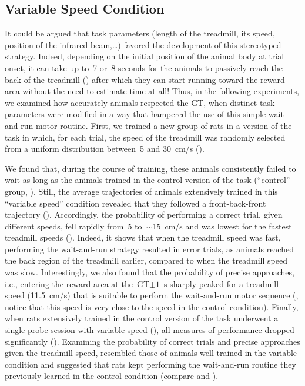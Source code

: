 \subsection{Variable Speed Condition}
\label{ch:time:varSpeed}

It could be argued that task parameters (length of the treadmill, its speed, position of the infrared beam,\dots) favored the development of this stereotyped strategy.
Indeed, depending on the initial position of the animal body at trial onset, it can take up to~7 or~8 seconds for the animals to passively reach the back of the treadmill () after which they can start running toward the reward area without the need to estimate time at all!
Thus, in the following experiments, we examined how accurately animals respected the GT, when distinct task parameters were modified in a way that hampered the use of this simple wait-and-run motor routine.
First, we trained a new group of rats in a version of the task in which, for each trial, the speed of the treadmill was randomly selected from a uniform distribution between~5 and 30~cm/s ().

We found that, during the course of training, these animals consistently failed to wait as long as the animals trained in the control version of the task (``control'' group, ).
Still, the average trajectories of animals extensively trained in this ``variable speed'' condition revealed that they followed a front-back-front trajectory ().
Accordingly, the probability of performing a correct trial, given different speeds, fell rapidly from~5 to~$\sim$15~cm/s and was lowest for the fastest treadmill speeds ().
Indeed, it shows that when the treadmill speed was fast, performing the wait-and-run strategy resulted in error trials, as animals reached the back region of the treadmill earlier, compared to when the treadmill speed was slow.
Interestingly, we also found that the probability of precise approaches, i.e., entering the reward area at the~GT$\pm 1$~s sharply peaked for a treadmill speed (11.5~cm/s) that is suitable to perform the wait-and-run motor sequence (, notice that this speed is very close to the speed in the control condition).
Finally, when rats extensively trained in the control version of the task underwent a single probe session with variable speed (), all measures of performance dropped significantly ().
Examining the probability of correct trials and precise approaches given the treadmill speed, resembled those of animals well-trained in the variable condition and suggested that rats kept performing the wait-and-run routine they previously learned in the control condition (compare  and ).


